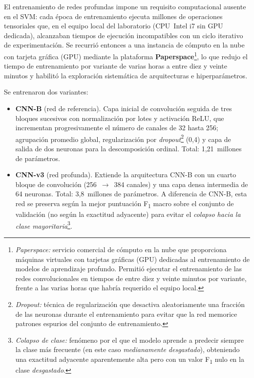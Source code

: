 \documentclass[12pt, letterpaper]{report}
\begin{document}
El entrenamiento de redes profundas impone un requisito computacional
ausente en el SVM: cada época de entrenamiento ejecuta millones de
operaciones tensoriales que, en el equipo local del laboratorio
(CPU~Intel i7 sin GPU dedicada), alcanzaban tiempos de ejecución
incompatibles con un ciclo iterativo de experimentación. Se recurrió
entonces a una instancia de cómputo en la nube con tarjeta gráfica (GPU)
mediante la plataforma \textbf{Paperspace}\footnote{\emph{Paperspace:}
servicio comercial de cómputo en la nube que proporciona máquinas
virtuales con tarjetas gráficas (GPU) dedicadas al entrenamiento de
modelos de aprendizaje profundo. Permitió ejecutar el entrenamiento de
las redes convolucionales en tiempos de entre diez y veinte minutos por
variante, frente a las varias horas que habría requerido el equipo
local.}, lo que redujo el tiempo de entrenamiento por variante de
varias horas a entre diez y veinte minutos y habilitó la exploración
sistemática de arquitecturas e hiperparámetros.

Se entrenaron dos variantes:

\begin{itemize}[leftmargin=1.77cm]
\item \textbf{CNN-B} (red de referencia). Capa inicial de convolución
      seguida de tres bloques sucesivos con normalización por lotes y
      activación ReLU, que incrementan progresivamente el número de
      canales de 32 hasta 256; agrupación promedio global, regularización
      por \emph{dropout}\footnote{\emph{Dropout:} técnica de
      regularización que desactiva aleatoriamente una fracción de las
      neuronas durante el entrenamiento para evitar que la red memorice
      patrones espurios del conjunto de entrenamiento.} (0{,}4) y capa
      de salida de dos neuronas para la descomposición ordinal. Total:
      1{,}21~millones de parámetros.
\item \textbf{CNN-v3} (red profunda). Extiende la arquitectura CNN-B con
      un cuarto bloque de convolución (256~$\rightarrow$~384 canales) y
      una capa densa intermedia de 64 neuronas. Total: 3{,}8~millones de
      parámetros. A diferencia de CNN-B, esta red se preserva según la
      mejor puntuación F\textsubscript{1} macro sobre el conjunto de
      validación (no según la exactitud adyacente) para evitar el
      \emph{colapso hacia la clase mayoritaria}\footnote{\emph{Colapso
      de clase:} fenómeno por el que el modelo aprende a predecir
      siempre la clase más frecuente (en este caso \emph{medianamente
      desgastado}), obteniendo una exactitud adyacente aparentemente
      alta pero con un valor F\textsubscript{1} nulo en la clase
      \emph{desgastado}.}.
\end{itemize}
\end{document}
